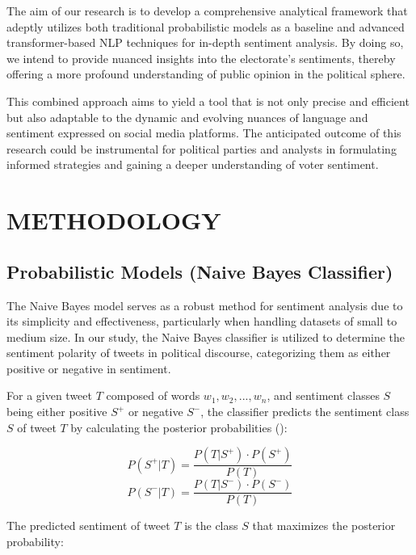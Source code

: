 \documentclass[10pt]{article}
\begin{document}
\begin{multicols}{2}
The aim of our research is to develop a comprehensive analytical framework that adeptly utilizes both traditional probabilistic models as a baseline and advanced transformer-based NLP techniques for in-depth sentiment analysis. By doing so, we intend to provide nuanced insights into the electorate's sentiments, thereby offering a more profound understanding of public opinion in the political sphere.

This combined approach aims to yield a tool that is not only precise and efficient but also adaptable to the dynamic and evolving nuances of language and sentiment expressed on social media platforms. The anticipated outcome of this research could be instrumental for political parties and analysts in formulating informed strategies and gaining a deeper understanding of voter sentiment.


\section{METHODOLOGY}

\subsection{Probabilistic Models (Naive Bayes Classifier)}

The Naive Bayes model serves as a robust method for sentiment analysis due to its simplicity and effectiveness, particularly when handling datasets of small to medium size. In our study, the Naive Bayes classifier is utilized to determine the sentiment polarity of tweets in political discourse, categorizing them as either positive or negative in sentiment.

For a given tweet \( T \) composed of words \( w_1, w_2, ..., w_n \), and sentiment classes \( S \) being either positive \( S^+ \) or negative \( S^- \), the classifier predicts the sentiment class \( S \) of tweet \( T \) by calculating the posterior probabilities (\cite{keselj2020nlp}):

\begin{equation}
    P(S^+|T) = \frac{P(T|S^+) \cdot P(S^+)}{P(T)}
\end{equation}
\begin{equation}
    P(S^-|T) = \frac{P(T|S^-) \cdot P(S^-)}{P(T)}
\end{equation}

The predicted sentiment of tweet \( T \) is the class \( S \) that maximizes the posterior probability:


\end{multicols}
\end{document}
